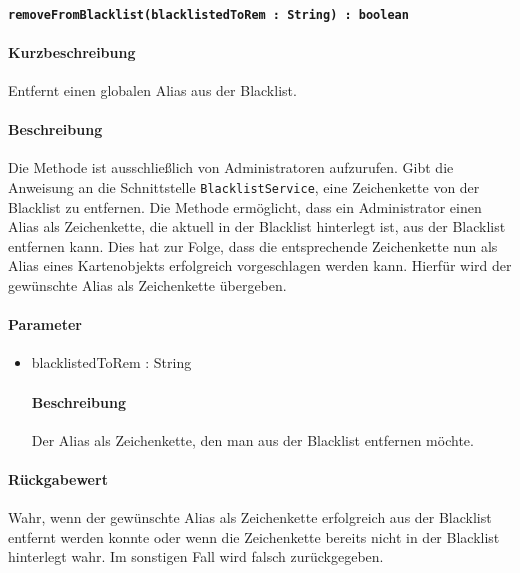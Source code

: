 \paragraph*{\texttt{removeFromBlacklist(blacklistedToRem : String) : boolean}}%
\paragraph*{Kurzbeschreibung}
Entfernt einen globalen Alias aus der Blacklist.
\paragraph*{Beschreibung}
Die Methode ist ausschließlich von Administratoren aufzurufen.
Gibt die Anweisung an die Schnittstelle \texttt{BlacklistService}, eine Zeichenkette von der Blacklist zu entfernen.
Die Methode ermöglicht, dass ein Administrator einen Alias als Zeichenkette, die aktuell in der Blacklist hinterlegt ist, aus der Blacklist entfernen kann.
Dies hat zur Folge, dass die entsprechende Zeichenkette nun als Alias eines Kartenobjekts erfolgreich vorgeschlagen werden kann.
Hierfür wird der gewünschte Alias als Zeichenkette übergeben.
\paragraph*{Parameter}
\begin{itemize}
    \item blacklistedToRem : String
    		\paragraph*{Beschreibung}
    		Der Alias als Zeichenkette, den man aus der Blacklist entfernen möchte.
\end{itemize}
\paragraph*{Rückgabewert}
Wahr, wenn der gewünschte Alias als Zeichenkette erfolgreich aus der Blacklist entfernt werden konnte oder wenn die Zeichenkette bereits nicht in der Blacklist hinterlegt wahr. Im sonstigen Fall wird falsch zurückgegeben.
